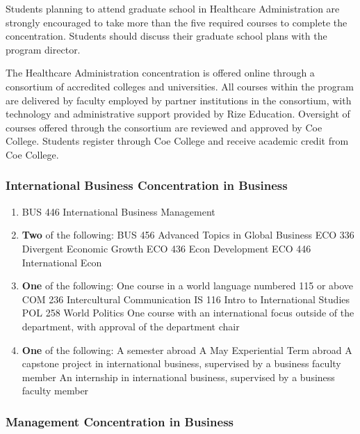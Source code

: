 \documentclass[
  letterpaper,
]{scrbook}
\providecommand{\tightlist}{%
  \setlength{\itemsep}{0pt}\setlength{\parskip}{0pt}}
\begin{document}
Students planning to attend graduate school in Healthcare Administration
are strongly encouraged to take more than the five required courses to
complete the concentration. Students should discuss their graduate
school plans with the program director.

The Healthcare Administration concentration is offered online through a
consortium of accredited colleges and universities. All courses within
the program are delivered by faculty employed by partner institutions in
the consortium, with technology and administrative support provided by
Rize Education. Oversight of courses offered through the consortium are
reviewed and approved by Coe College. Students register through Coe
College and receive academic credit from Coe College.

\subsubsection{International Business Concentration in
Business}\label{international-business-concentration-in-business}

\begin{enumerate}
\def\labelenumi{\arabic{enumi}.}
\tightlist
\item
  BUS 446 International Business Management
\item
  \textbf{Two} of the following: BUS 456 Advanced Topics in Global
  Business ECO 336 Divergent Economic Growth ECO 436 Econ Development
  ECO 446 International Econ
\item
  \textbf{One} of the following: One course in a world language numbered
  115 or above COM 236 Intercultural Communication IS 116 Intro to
  International Studies POL 258 World Politics One course with an
  international focus outside of the department, with approval of the
  department chair
\item
  \textbf{One} of the following: A semester abroad A May Experiential
  Term abroad A capstone project in international business, supervised
  by a business faculty member An internship in international business,
  supervised by a business faculty member
\end{enumerate}

\subsubsection{Management Concentration in
Business}\label{management-concentration-in-business}
\end{document}
